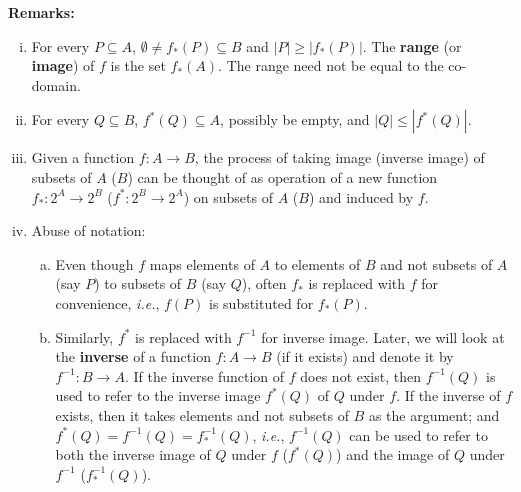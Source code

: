 \documentclass[a4paper,english,12pt]{article}
\begin{document}
\textbf{Remarks:}
\begin{enumerate}[i)]
\item For every $P\subseteq A$, $\emptyset \neq f_*(P)\subseteq B$ and $|P|\geqslant |f_*(P)|$. The \textbf{range} (or \textbf{image}) of $f$ is the set $f_*(A)$. The range need not be equal to the co-domain.
\item For every $Q\subseteq B$, $f^*(Q)\subseteq A$, possibly be empty, and $|Q|\leqslant |f^*(Q)|$. 
\item Given a function $f:A\rightarrow B$, the process of taking image (inverse image) of subsets of $A$ ($B$) can be thought of as operation of a new function $f_*:2^A\rightarrow 2^B$ ($f^*:2^B\rightarrow 2^A$) on subsets of $A$ ($B$) and induced by $f$.
\item Abuse of notation: 
\begin{enumerate}[a)]
\item Even though $f$ maps elements of $A$ to elements of $B$ and not subsets of $A$ (say $P$) to subsets of $B$ (say $Q$), often $f_*$ is replaced with $f$ for convenience, \textit{i.e.}, $f(P)$ is substituted for $f_*(P)$.
\item Similarly, $f^*$ is replaced with $f^{-1}$ for inverse image. Later, we will look at the \textbf{inverse} of a function $f:A\rightarrow B$ (if it exists) and denote it by $f^{-1}:B\rightarrow A$. If the inverse function of $f$ does not exist, then $f^{-1}(Q)$ is used to refer to the inverse image $f^*(Q)$ of $Q$ under $f$. If the inverse of $f$ exists, then it takes elements and not subsets of $B$ as the argument; and $f^*(Q)=f^{-1}(Q)=f^{-1}_*(Q)$, \textit{i.e.}, $f^{-1}(Q)$ can be used to refer to both the inverse image of $Q$ under $f$ ($f^*(Q)$) and the image of $Q$ under $f^{-1}$ ($f^{-1}_*(Q)$).
\end{enumerate}
\end{enumerate}
\end{document}
